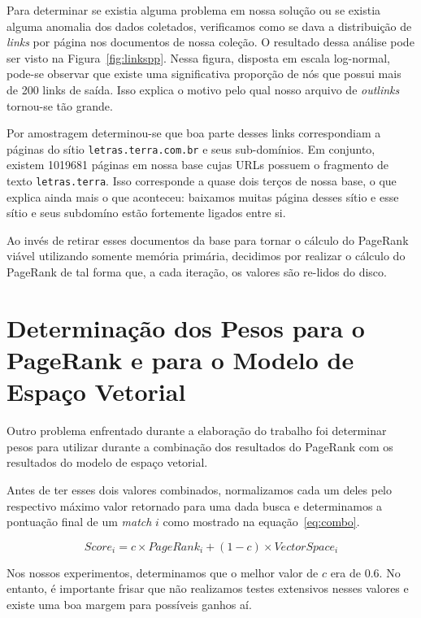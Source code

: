 \documentclass[10pt,twocolumn]{article}
\begin{document}
Para determinar se existia alguma problema em nossa solução ou se
existia alguma anomalia dos dados coletados, verificamos como se dava a
distribuição de \emph{links} por página nos documentos de nossa coleção.
O resultado dessa análise pode ser visto na Figura~\ref{fig:linkspp}.
Nessa figura, disposta em escala log-normal, pode-se observar que existe
uma significativa proporção de nós que possui mais de 200 links de
saída. Isso explica o motivo pelo qual nosso arquivo de \emph{outlinks}
tornou-se tão grande.

Por amostragem determinou-se que boa parte desses links correspondiam a
páginas do sítio \texttt{letras.terra.com.br} e seus sub-domínios. Em
conjunto, existem 1019681 páginas em nossa base cujas URLs possuem o
fragmento de texto \texttt{letras.terra}. Isso corresponde a quase dois
terços de nossa base, o que explica ainda mais o que aconteceu: baixamos
muitas página desses sítio e esse sítio e seus subdomíno estão
fortemente ligados entre si.

Ao invés de retirar esses documentos da base para tornar o cálculo do
PageRank viável utilizando somente memória primária, decidimos por
realizar o cálculo do PageRank de tal forma que, a cada iteração, os
valores são re-lidos do disco.

\section{Determinação dos Pesos para o PageRank e para o Modelo de
Espaço Vetorial}

Outro problema enfrentado durante a elaboração do trabalho foi
determinar pesos para utilizar durante a combinação dos resultados do
PageRank com os resultados do modelo de espaço vetorial.

Antes de ter esses dois valores combinados, normalizamos cada um deles
pelo respectivo máximo valor retornado para uma dada busca e
determinamos a pontuação final de um \emph{match} \(i\) como mostrado na
equação~\ref{eq:combo}.

\begin{equation}
Score_i = c\times PageRank_i + (1-c)\times VectorSpace_i
\label{eq:combo}
\end{equation}

Nos nossos experimentos, determinamos que o melhor valor de \(c\) era de
\(0.6\). No entanto, é importante frisar que não realizamos testes
extensivos nesses valores e existe uma boa margem para possíveis ganhos
aí.


\end{document}
